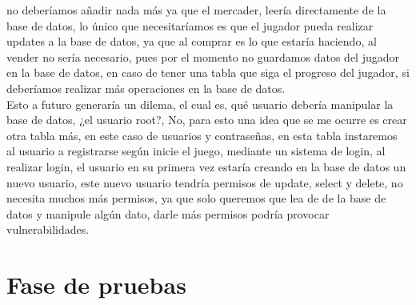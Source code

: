 \documentclass[a4paper]{article}
\begin{document}
no deberíamos añadir nada más ya que el mercader, leería directamente de la base de datos, lo único que necesitaríamos es que el jugador pueda realizar updates a la base de datos, ya que al comprar es lo que estaría haciendo, al vender no sería necesario, pues
por el momento no guardamos datos del jugador en la base de datos, en caso de tener una tabla que siga el progreso del jugador, si deberíamos realizar más operaciones en la base de datos.\\
Esto a futuro generaría un dilema, el cual es, qué usuario debería manipular la base de datos, ¿el usuario root?, No, para esto una idea que se me ocurre es crear otra tabla más, en este caso de usuarios y contraseñas, en esta tabla instaremos al usuario a registrarse según inicie el juego, mediante un sistema de login,
al realizar login, el usuario en su primera vez estaría creando en la base de datos un nuevo usuario, este nuevo usuario tendría permisos de update, select y delete, no necesita muchos más permisos, ya que solo queremos que lea de de la base de datos y manipule algún dato, darle más permisos podría provocar vulnerabilidades.
\clearpage
\section{Fase de pruebas}
\end{document}
